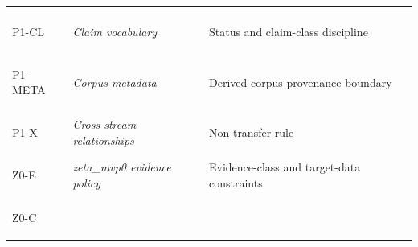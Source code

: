 \begin{longtable}[]{@{}lll@{}}
\begin{minipage}[t]{0.30\columnwidth}
\end{minipage}\tabularnewline
\begin{minipage}[t]{0.30\columnwidth}\raggedright
\hypertarget{record:P1-CL}{P1-CL}\strut
\end{minipage} & \begin{minipage}[t]{0.30\columnwidth}\raggedright
\textit{Claim vocabulary}\strut
\end{minipage} & \begin{minipage}[t]{0.30\columnwidth}\raggedright
Status and claim-class discipline\strut
\end{minipage}\tabularnewline
\begin{minipage}[t]{0.30\columnwidth}\raggedright
\hypertarget{record:P1-META}{P1-META}\strut
\end{minipage} & \begin{minipage}[t]{0.30\columnwidth}\raggedright
\textit{Corpus metadata}\strut
\end{minipage} & \begin{minipage}[t]{0.30\columnwidth}\raggedright
Derived-corpus provenance boundary\strut
\end{minipage}\tabularnewline
\begin{minipage}[t]{0.30\columnwidth}\raggedright
\hypertarget{record:P1-X}{P1-X}\strut
\end{minipage} & \begin{minipage}[t]{0.30\columnwidth}\raggedright
\textit{Cross-stream relationships}\strut
\end{minipage} & \begin{minipage}[t]{0.30\columnwidth}\raggedright
Non-transfer rule\strut
\end{minipage}\tabularnewline
\begin{minipage}[t]{0.30\columnwidth}\raggedright
\hypertarget{record:Z0-E}{Z0-E}\strut
\end{minipage} & \begin{minipage}[t]{0.30\columnwidth}\raggedright
\textit{zeta\_mvp0 evidence policy}\strut
\end{minipage} & \begin{minipage}[t]{0.30\columnwidth}\raggedright
Evidence-class and target-data constraints\strut
\end{minipage}\tabularnewline
\begin{minipage}[t]{0.30\columnwidth}\raggedright
\hypertarget{record:Z0-C}{Z0-C}\strut
\end{minipage} & \begin{minipage}[t]{0.30\columnwidth}\raggedright

\end{minipage}
\end{longtable}
